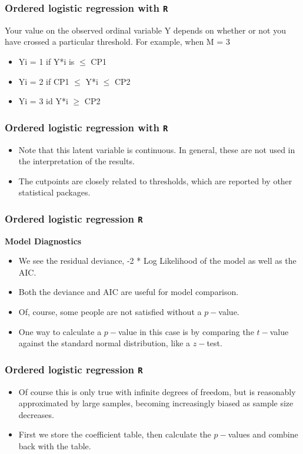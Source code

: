 \documentclass[00-GLMregslides.tex]{subfiles}
\begin{document}
\begin{frame}
\frametitle{Ordered logistic regression with \texttt{R} }
Your value on the
observed ordinal variable Y depends on whether or not you have crossed a particular threshold. For
example, when M = 3
\begin{itemize}
\item Yi = 1 if Y*i is $ \le $ CP1
\item Yi = 2 if CP1 $ \le $ Y*i $ \le $ CP2
\item Yi = 3 id Y*i $ \ge $ CP2
\end{itemize}
\end{frame}
\begin{frame}[fragile]
	\frametitle{Ordered logistic regression with \texttt{R} }
	\Large

\begin{itemize}
\item Note that this latent variable is continuous. In general, these are not used in the interpretation of the results. \item  The cutpoints are closely related to thresholds, which are reported by other statistical packages.
\end{itemize}
\end{frame}
\begin{frame}[fragile]
	\frametitle{Ordered logistic regression \texttt{R} }
	\Large
\textbf{Model Diagnostics}
\begin{itemize}
\item We see the residual deviance, -2 * Log Likelihood of the model as well as the AIC. 
\item Both the deviance and AIC are useful for model comparison.
\item Of, course, some people are not satisfied without a $p-$value.
\item One way to calculate a $p-$value in this case is by comparing the $t-$value against the standard normal distribution, like a $z-$test. 
\end{itemize}
\end{frame}
\begin{frame}[fragile]

\frametitle{Ordered logistic regression \texttt{R} }

	\Large
\begin{itemize}
\item Of course this is only true with infinite degrees of freedom, but is reasonably approximated by large 
samples, becoming increasingly biased as sample size decreases. 


\item First we store the coefficient table, then calculate the $p-$values and combine back with the table.

\end{itemize}
\end{frame}
\end{document}
